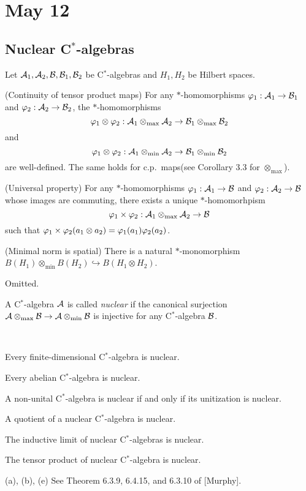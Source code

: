 \documentclass{../../small}
\begin{document}
% 


\newpage
\section{May 12}



\subsection{Nuclear C$^*$-algebras}

\begin{prop}
Let $\mathcal{A}_1,\mathcal{A}_2,\mathcal{B},\mathcal{B}_1,\mathcal{B}_2$ be C$^*$-algebras and $H_1,H_2$ be Hilbert spaces.
\begin{parts}
\item (Continuity of tensor product maps)
For any $*$-homomorphisms $\varphi_1:\mathcal{A}_1\to\mathcal{B}_1$ and $\varphi_2:\mathcal{A}_2\to\mathcal{B}_2$, the $*$-homomorphisms
\[\varphi_1\otimes\varphi_2:\mathcal{A}_1\otimes_{\max}\mathcal{A}_2\to\mathcal{B}_1\otimes_{\max}\mathcal{B}_2\]
and
\[\varphi_1\otimes\varphi_2:\mathcal{A}_1\otimes_{\min}\mathcal{A}_2\to\mathcal{B}_1\otimes_{\min}\mathcal{B}_2\]
are well-defined.
The same holds for c.p.~maps(see Corollary 3.3 for $\otimes_{\max}$).
\item (Universal property)
For any $*$-homomorphisms $\varphi_1:\mathcal{A}_1\to\mathcal{B}$ and $\varphi_2:\mathcal{A}_2\to\mathcal{B}$ whose images are commuting, there exists a unique $*$-homomorhpism
\[\varphi_1\times\varphi_2:\mathcal{A}_1\otimes_{\max}\mathcal{A}_2\to\mathcal{B}\]
such that $\varphi_1\times\varphi_2(a_1\otimes a_2)=\varphi_1(a_1)\varphi_2(a_2)$.
\item (Minimal norm is spatial)
There is a natural $*$-monomorphism $B(H_1)\otimes_{\min}B(H_2)\hookrightarrow B(H_1\otimes H_2)$.
\end{parts}
\end{prop}
\begin{pf}
Omitted.
\end{pf}

\begin{defn}
A C$^*$-algebra $\mathcal{A}$ is called \emph{nuclear} if the canonical surjection $\mathcal{A}\otimes_{\max}\mathcal{B}\to\mathcal{A}\otimes_{\min}\mathcal{B}$ is injective for any C$^*$-algebra $\mathcal{B}$.
\end{defn}


\begin{ex}\,
\begin{parts}
\item Every finite-dimensional C$^*$-algebra is nuclear.
\item Every abelian C$^*$-algebra is nuclear.
\item A non-unital C$^*$-algebra is nuclear if and only if its unitization is nuclear.
\item A quotient of a nuclear C$^*$-algebra is nuclear.
\item The inductive limit of nuclear C$^*$-algebras is nuclear.
\item The tensor product of nuclear C$^*$-algebra is nuclear.
\end{parts}
\end{ex}
\begin{pf}
(a), (b), (e) See Theorem 6.3.9, 6.4.15, and 6.3.10 of [Murphy].
\end{pf}
\end{document}
